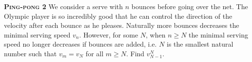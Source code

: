 \begin{problem}{\textbf{\textsc{Ping-pong 2}}} We consider a serve with $n$ bounces before going over the net. The Olympic player is so incredibly good that he can control the direction of the velocity after each bounce as he pleases. Naturally more bounces decreases the minimal serving speed $v_n$. However, for some $N$, when $n\geq N$ the minimal serving speed no longer decreases if bounces are added, i.e. $N$ is the smallest natural number such that $v_m=v_N$ for all $m\geq N.$ Find $v_{N-1}^N$.

\end{problem}